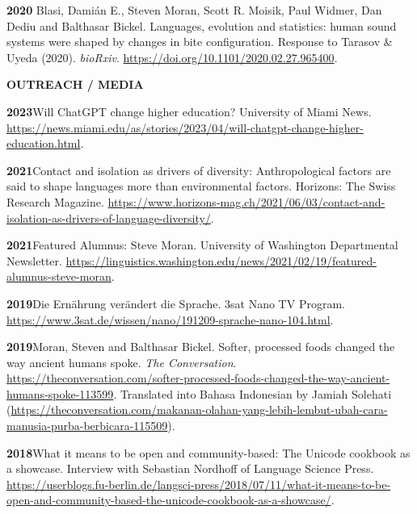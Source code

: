 \documentclass[11pt]{article}
\newcommand{\hangpara}{
 \setlength{\parindent}{0in} %
 \hangindent=0.42in %
}
\begin{document}
\vskip 6pt
\hangpara
{\bf 2020} Blasi, Damián E., Steven Moran, Scott R. Moisik, Paul Widmer, Dan Dediu and Balthasar Bickel. Languages, evolution and statistics: human sound systems were shaped by changes in bite configuration. Response to Tarasov \& Uyeda (2020). \textit{bioRxiv}. \url{https://doi.org/10.1101/2020.02.27.965400}.

\vskip 20pt
\begin{flushleft}
{\bf OUTREACH / MEDIA}
\end{flushleft}


\hangpara
{\bf 2023}\hspace{1ex}Will ChatGPT change higher education? University of Miami News. \url{https://news.miami.edu/as/stories/2023/04/will-chatgpt-change-higher-education.html}.

\hangpara
\vskip 6pt
{\bf 2021}\hspace{1ex}Contact and isolation as drivers of diversity: Anthropological factors are said to shape languages more than environmental factors. Horizons: The Swiss Research Magazine. \url{https://www.horizons-mag.ch/2021/06/03/contact-and-isolation-as-drivers-of-language-diversity/}.

\hangpara
\vskip 6pt
{\bf 2021}\hspace{1ex}Featured Alumnus: Steve Moran. University of Washington Departmental Newsletter. \url{https://linguistics.washington.edu/news/2021/02/19/featured-alumnus-steve-moran}.

\hangpara
\vskip 6pt
{\bf 2019}\hspace{1ex}Die Ernährung verändert die Sprache. 3sat Nano TV Program. \url{https://www.3sat.de/wissen/nano/191209-sprache-nano-104.html}.

\hangpara
\vskip 6pt
{\bf 2019}\hspace{1ex}Moran, Steven and Balthasar Bickel. Softer, processed foods changed the way ancient humans spoke. \textit{The Conversation}. \url{https://theconversation.com/softer-processed-foods-changed-the-way-ancient-humans-spoke-113599}. Translated into Bahasa Indonesian by Jamiah Solehati (\url{https://theconversation.com/makanan-olahan-yang-lebih-lembut-ubah-cara-manusia-purba-berbicara-115509}).

\hangpara
\vskip 6pt {\bf 2018}\hspace{1ex}What it means to be open and community-based: The Unicode cookbook as a showcase. Interview with Sebastian Nordhoff of Language Science Press. \url{https://userblogs.fu-berlin.de/langsci-press/2018/07/11/what-it-means-to-be-open-and-community-based-the-unicode-cookbook-as-a-showcase/}.
\end{document}
